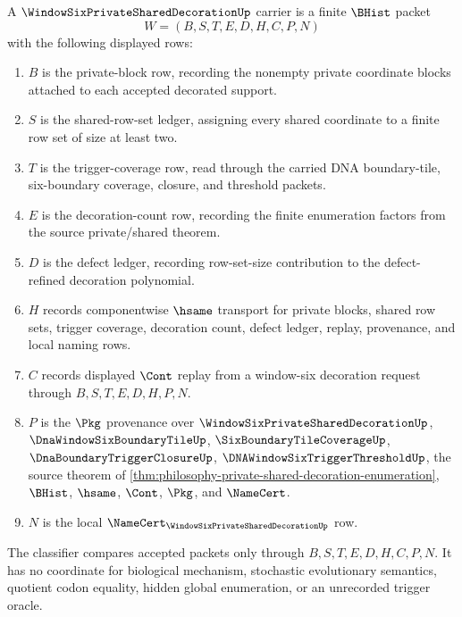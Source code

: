 \begin{definition}\label{def:window-six-private-shared-decoration-carrier}
A $\WindowSixPrivateSharedDecorationUp$ carrier is a finite $\BHist$ packet
$$
W=(B,S,T,E,D,H,C,P,N)
$$
with the following displayed rows:
\begin{enumerate}
\item $B$ is the private-block row, recording the nonempty private coordinate blocks attached to each accepted decorated support.
\item $S$ is the shared-row-set ledger, assigning every shared coordinate to a finite row set of size at least two.
\item $T$ is the trigger-coverage row, read through the carried DNA boundary-tile, six-boundary coverage, closure, and threshold packets.
\item $E$ is the decoration-count row, recording the finite enumeration factors from the source private/shared theorem.
\item $D$ is the defect ledger, recording row-set-size contribution to the defect-refined decoration polynomial.
\item $H$ records componentwise $\hsame$ transport for private blocks, shared row sets, trigger coverage, decoration count, defect ledger, replay, provenance, and local naming rows.
\item $C$ records displayed $\Cont$ replay from a window-six decoration request through $B,S,T,E,D,H,P,N$.
\item $P$ is the $\Pkg$ provenance over $\WindowSixPrivateSharedDecorationUp$, $\DnaWindowSixBoundaryTileUp$, $\SixBoundaryTileCoverageUp$, $\DnaBoundaryTriggerClosureUp$, $\DNAWindowSixTriggerThresholdUp$, the source theorem of \autoref{thm:philosophy-private-shared-decoration-enumeration}, $\BHist$, $\hsame$, $\Cont$, $\Pkg$, and $\NameCert$.
\item $N$ is the local $\NameCert_{\WindowSixPrivateSharedDecorationUp}$ row.
\end{enumerate}
The classifier compares accepted packets only through $B,S,T,E,D,H,C,P,N$. It has no coordinate for biological mechanism, stochastic evolutionary semantics, quotient codon equality, hidden global enumeration, or an unrecorded trigger oracle.
\end{definition}

